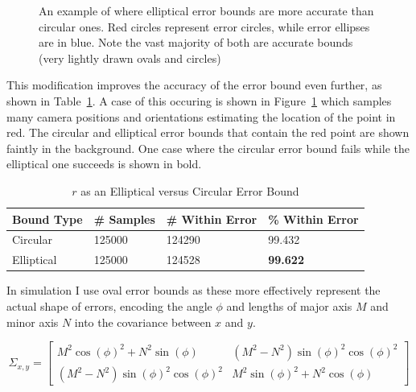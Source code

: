 \documentclass[a4paper,12pt,twoside,openright]{report}
\begin{document}
\begin{figure}[htb]
    \begin{center}
        
    \end{center}
    \caption[elliptical versus circular error]{An example of where elliptical error bounds are more accurate than circular ones. Red circles represent error circles, while error ellipses are in blue. Note the vast majority of both are accurate bounds (very lightly drawn ovals and circles)}
    \label{fig:camera:oval better}
\end{figure}

This modification improves the accuracy of the error bound even further, as shown
in Table~\ref{tab:camera:ellipse vs circle}. A case of this occuring is shown
in Figure~\ref{fig:camera:oval better} which samples many camera positions and orientations
estimating the location of the point in red. The circular and elliptical 
error bounds that contain the red point are shown faintly in the background. One
case where the circular error bound fails while the elliptical one succeeds
is shown in bold.

\begin{table}[htb]
    \centering
    \caption[Elliptical versus Circular Error Bound]{$r$ as an Elliptical versus Circular Error Bound}
    \label{tab:camera:ellipse vs circle}
    \begin{tabular}{@{}llll@{}}
        \toprule
        Bound Type    & \# Samples  & \# Within Error& \% Within Error \\ \midrule
        Circular      &   125000              & 124290                  & 99.432  \\
        Elliptical    &   125000              & 124528                  & \textbf{99.622}
    \end{tabular}
\end{table}


In simulation I use oval error bounds as these more effectively represent the 
actual shape of errors, encoding the angle $\phi$ and lengths of major axis $M$
and minor axis $N$ into the covariance between $x$ and $y$.

\[
\Sigma_{x,y} =
  \begin{bmatrix}
    M^2 \cos(\phi)^2 + N^2 \sin(\phi) &  (M^2 - N^2) \sin(\phi)^2 \cos(\phi)^2 \\
    (M^2 - N^2) \sin(\phi)^2 \cos(\phi)^2  &  M^2 \sin(\phi)^2 + N^2\cos(\phi) 
  \end{bmatrix}
\]
\end{document}
